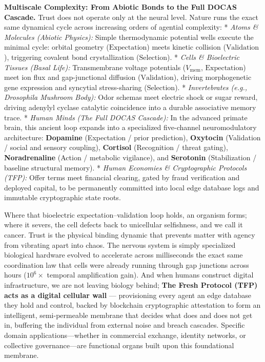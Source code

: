 \documentclass[
]{article}
\begin{document}
\textbf{Multiscale Complexity: From Abiotic Bonds to the Full DOCAS
Cascade.} Trust does not operate only at the neural level. Nature runs
the exact same dynamical cycle across increasing orders of agential
complexity: * \emph{Atoms \& Molecules (Abiotic Physics):} Simple
thermodynamic potential wells execute the minimal cycle: orbital
geometry (\(\text{Expectation}\)) meets kinetic collision
(\(\text{Validation}\)), triggering covalent bond crystallization
(\(\text{Selection}\)). * \emph{Cells \& Bioelectric Tissues (Basal
Life):} Transmembrane voltage potentials (\(V_{\text{mem}}\),
\(\text{Expectation}\)) meet ion flux and gap-junctional diffusion
(\(\text{Validation}\)), driving morphogenetic gene expression and
syncytial stress-sharing (\(\text{Selection}\)). * \emph{Invertebrates
(e.g., Drosophila Mushroom Body):} Odor schemas meet electric shock or
sugar reward, driving adenylyl cyclase catalytic coincidence into a
durable associative memory trace. * \emph{Human Minds (The Full DOCAS
Cascade):} In the advanced primate brain, this ancient loop expands into
a specialized five-channel neuromodulatory architecture:
\textbf{Dopamine} (Expectation / prior prediction), \textbf{Oxytocin}
(Validation / social and sensory coupling), \textbf{Cortisol}
(Recognition / threat gating), \textbf{Noradrenaline} (Action /
metabolic vigilance), and \textbf{Serotonin} (Stabilization / baseline
structural memory). * \emph{Human Economies \& Cryptographic Protocols
(TFP):} Offer terms meet financial clearing, gated by fraud verification
and deployed capital, to be permanently committed into local edge
database logs and immutable cryptographic state roots.

Where that bioelectric expectation--validation loop holds, an organism
forms; where it severs, the cell defects back to unicellular
selfishness, and we call it cancer. Trust is the physical binding
dynamic that prevents matter with agency from vibrating apart into
chaos. The nervous system is simply specialized biological hardware
evolved to accelerate across milliseconds the exact same coordination
law that cells were already running through gap junctions across hours
(\(10^6\times\) temporal amplification gain). And when humans construct
digital infrastructure, we are not leaving biology behind; \textbf{The
Fresh Protocol (TFP) acts as a digital cellular wall} --- provisioning
every agent an edge database they hold and control, backed by blockchain
cryptographic attestation to form an intelligent, semi-permeable
membrane that decides what does and does not get in, buffering the
individual from external noise and breach cascades. Specific domain
applications---whether in commercial exchange, identity networks, or
collective governance---are functional organs built upon this
foundational membrane.
\end{document}
